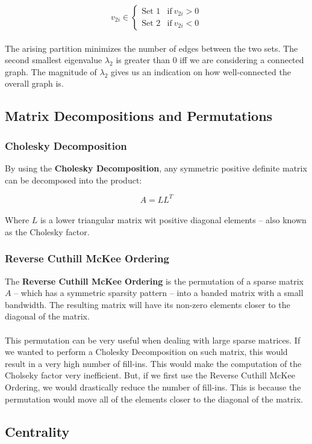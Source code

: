 \documentclass{article}
\begin{document}
\[ v_{2i} \in \begin{cases} \text{Set 1} & \text{if}~ v_{2i} > 0 \\ \text{Set 2} & \text{if}~ v_{2i} < 0 \end{cases} \] \\
The arising partition minimizes the number of edges between the two sets. The second smallest eigenvalue $\lambda_2$ is greater than 0 iff we are considering a connected graph. The magnitude of $\lambda_2$ gives us an indication on how well-connected the overall graph is.

\subsection{Matrix Decompositions and Permutations}
\subsubsection{Cholesky Decomposition}
By using the \textbf{Cholesky Decomposition}, any symmetric positive definite matrix can be decomposed into the product:

\[ A = L L^T \] \\
Where $L$ is a lower triangular matrix wit positive diagonal elements -- also known as the Cholesky factor.

\subsubsection{Reverse Cuthill McKee Ordering}
The \textbf{Reverse Cuthill McKee Ordering} is the permutation of a sparse matrix $A$ -- which has a symmetric sparsity pattern -- into a banded matrix with a small bandwidth. The resulting matrix will have its non-zero elements closer to the diagonal of the matrix. \\ \\
This permutation can be very useful when dealing with large sparse matrices. If we wanted to perform a Cholesky Decomposition on such matrix, this would result in a very high number of fill-ins. This would make the computation of the Cholseky factor very inefficient. But, if we first use the Reverse Cuthill McKee Ordering, we would drastically reduce the number of fill-ins. This is because the permutation would move all of the elements closer to the diagonal of the matrix.

\subsection{Centrality}
\end{document}
